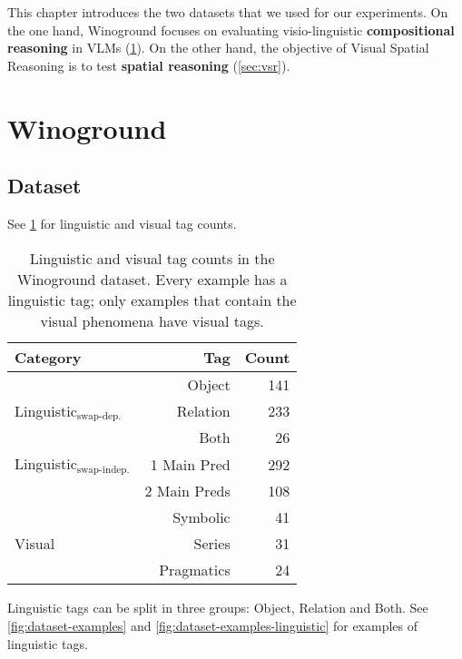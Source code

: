 This chapter introduces the two datasets that we used for our experiments. On the one hand, Winoground \cite{thrush2022winoground} focuses on evaluating visio-linguistic \textbf{compositional reasoning} in VLMs (\ref{sec:winoground}). On the other hand, the objective of Visual Spatial Reasoning \cite{liu2022visual} is to test \textbf{spatial reasoning} (\ref{sec:vsr}).

\section{Winoground} \label{sec:winoground}

\subsection{Dataset}

See \cref{tab:stats-tag-subset} for linguistic and visual tag counts.

\begin{table}[ht]
\centering
\begin{tabular}{lrr}
\toprule
 Category & Tag    &   Count \\
\midrule
 & Object   &     141 \\
 Linguistic$_\text{swap-dep.}$ & Relation &     233 \\
 & Both &      26 \\\midrule
 Linguistic$_\text{swap-indep.}$ & 1 Main Pred & 292 \\
 & 2 Main Preds & 108 \\\midrule
 & Symbolic &  41 \\
 Visual & Series &  31 \\
 & Pragmatics &  24\\
\bottomrule
\end{tabular}
\caption{Linguistic and visual tag counts in the Winoground dataset. Every example has a linguistic tag; only examples that contain the visual phenomena have visual tags.}
\label{tab:stats-tag-subset}
\end{table}

Linguistic tags can be split in three groups: Object, Relation and Both. See \cref{fig:dataset-examples} and \cref{fig:dataset-examples-linguistic} for examples of linguistic tags. 

